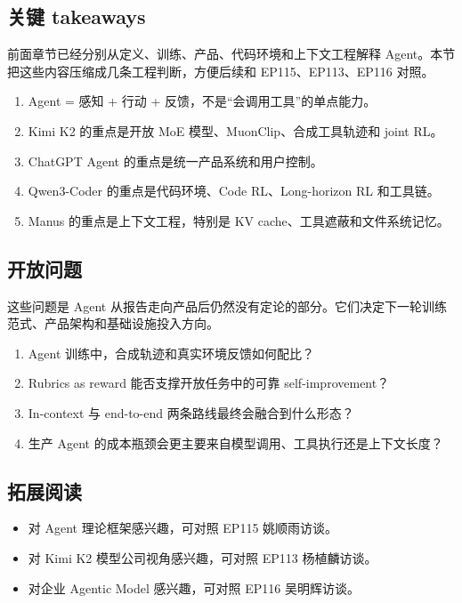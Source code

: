 \documentclass[a4paper]{article}
\begin{document}
\subsection{关键 takeaways}

前面章节已经分别从定义、训练、产品、代码环境和上下文工程解释 Agent。本节把这些内容压缩成几条工程判断，方便后续和 EP115、EP113、EP116 对照。

\begin{enumerate}
\item Agent = 感知 + 行动 + 反馈，不是“会调用工具”的单点能力。
\item Kimi K2 的重点是开放 MoE 模型、MuonClip、合成工具轨迹和 joint RL。
\item ChatGPT Agent 的重点是统一产品系统和用户控制。
\item Qwen3-Coder 的重点是代码环境、Code RL、Long-horizon RL 和工具链。
\item Manus 的重点是上下文工程，特别是 KV cache、工具遮蔽和文件系统记忆。
\end{enumerate}

\subsection{开放问题}

这些问题是 Agent 从报告走向产品后仍然没有定论的部分。它们决定下一轮训练范式、产品架构和基础设施投入方向。

\begin{enumerate}
\item Agent 训练中，合成轨迹和真实环境反馈如何配比？
\item Rubrics as reward 能否支撑开放任务中的可靠 self-improvement？
\item In-context 与 end-to-end 两条路线最终会融合到什么形态？
\item 生产 Agent 的成本瓶颈会更主要来自模型调用、工具执行还是上下文长度？
\end{enumerate}

\subsection{拓展阅读}

\begin{itemize}
\item 对 Agent 理论框架感兴趣，可对照 EP115 姚顺雨访谈。
\item 对 Kimi K2 模型公司视角感兴趣，可对照 EP113 杨植麟访谈。
\item 对企业 Agentic Model 感兴趣，可对照 EP116 吴明辉访谈。
\end{itemize}
\end{document}

